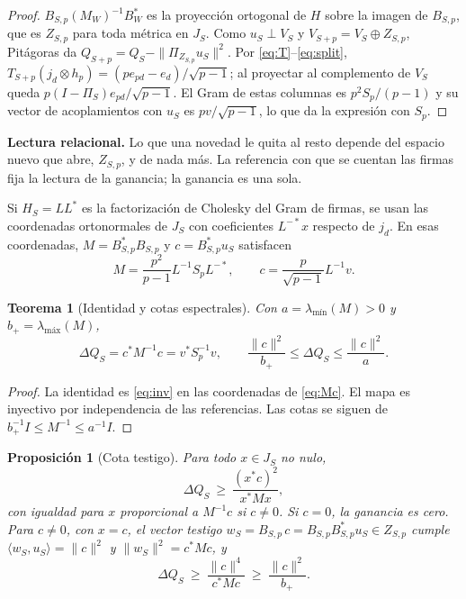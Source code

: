 \documentclass[11pt,a4paper]{article}
\theoremstyle{plain}
\newtheorem{proposicion}{Proposición}
\newtheorem{teorema}{Teorema}
\newcommand{\lmin}{\lambda_{\text{mín}}}
\newcommand{\lmax}{\lambda_{\text{máx}}}
\begin{document}
\begin{proof}
$B_{S,p}(M_W)^{-1}B_W^{*}$ es la proyección ortogonal de $H$ sobre la imagen de $B_{S,p}$, que es $Z_{S,p}$ para toda métrica en $J_S$. Como $u_S\perp V_S$ y $V_{S+p}=V_S\oplus Z_{S,p}$, Pitágoras da $Q_{S+p}=Q_S-\|\Pi_{Z_{S,p}}u_S\|^2$. Por \eqref{eq:T}–\eqref{eq:split}, $T_{S+p}(j_d\otimes h_p)=(pe_{pd}-e_d)/\sqrt{p-1}$; al proyectar al complemento de $V_S$ queda $p(I-\Pi_S)e_{pd}/\sqrt{p-1}$. El Gram de estas columnas es $p^2S_p/(p-1)$ y su vector de acoplamientos con $u_S$ es $pv/\sqrt{p-1}$, lo que da la expresión con $S_p$.
\end{proof}

\textbf{Lectura relacional.} Lo que una novedad le quita al resto depende del espacio nuevo que abre, $Z_{S,p}$, y de nada más. La referencia con que se cuentan las firmas fija la lectura de la ganancia; la ganancia es una sola.

Si $H_S=LL^*$ es la factorización de Cholesky del Gram de firmas, se usan las coordenadas ortonormales de $J_S$ con coeficientes $L^{-*}x$ respecto de $j_d$. En esas coordenadas, $M=B^*_{S,p}B_{S,p}$ y $c=B^*_{S,p}u_S$ satisfacen
\begin{equation}\label{eq:Mc}
M=\frac{p^2}{p-1}L^{-1}S_pL^{-*},\qquad c=\frac{p}{\sqrt{p-1}}L^{-1}v.
\end{equation}

\begin{teorema}[Identidad y cotas espectrales]\label{teo:id}
Con $a=\lmin(M)>0$ y $b_+=\lmax(M)$,
\begin{equation}\label{eq:spec}
\Delta Q_S=c^*M^{-1}c=v^*S_p^{-1}v,\qquad \frac{\|c\|^2}{b_+}\le\Delta Q_S\le\frac{\|c\|^2}{a}.
\end{equation}
\end{teorema}

\begin{proof}
La identidad es \eqref{eq:inv} en las coordenadas de \eqref{eq:Mc}. El mapa es inyectivo por independencia de las referencias. Las cotas se siguen de $b_+^{-1}I\le M^{-1}\le a^{-1}I$.
\end{proof}

\begin{proposicion}[Cota testigo]\label{prop:testigo}
Para todo $x\in J_S$ no nulo,
\begin{equation}\label{eq:testigo}
\Delta Q_S\ \ge\ \frac{(x^*c)^2}{x^*Mx},
\end{equation}
con igualdad para $x$ proporcional a $M^{-1}c$ si $c\ne0$. Si $c=0$, la ganancia es cero. Para $c\ne0$, con $x=c$, el vector testigo $w_S=B_{S,p}\,c=B_{S,p}B^*_{S,p}u_S\in Z_{S,p}$ cumple $\langle w_S,u_S\rangle=\|c\|^2$ y $\|w_S\|^2=c^*Mc$, y
\begin{equation}\label{eq:gamma}
\Delta Q_S\ \ge\ \frac{\|c\|^4}{c^*Mc}\ \ge\ \frac{\|c\|^2}{b_+}.
\end{equation}
\end{proposicion}
\end{document}
